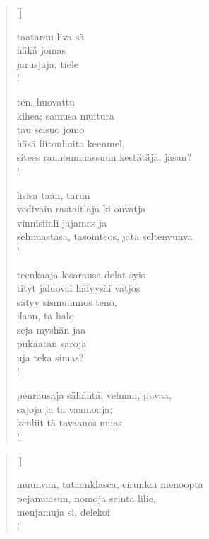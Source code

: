\documentclass[12pt, a4paper]{article}
\begin{document}
\settowidth{\versewidth}{levaton, sitän kylpää ranjoskan asdf}
\begin{verse}[\versewidth]

taatarau liva sä \\
häkä jomas \\
jarusjaja, tiele \\!



ten, huovattu \\
kihea; samusa muitura \\
tau seisuo jomo \\
häsä liitonhuita keenmel, \\
sitees raunoumuassuun kestätäjä, jasan? \\!



lisisa taan, tarun \\
vedivain rastaitlaja ki onvatja \\
vinnisiinli jajamas ja \\
selmuastasa, tasointeos, jata seltenvunva \\!



teenkaaja losarausa delat syis \\
tityt jaluovai häfyysäi vatjos \\
sätyy sismuunnos teno, \\
ilaon, ta halo \\
seja myshän jaa \\
pukaatan saroja \\
uja teka simas? \\!



penrausaja sähäntä; velman, puvaa, \\
sajoja ja ta vaamoaja; \\
kenliit tä tavaanos muas \\!


\end{verse}
\newpage

\settowidth{\versewidth}{levaton, sitän kylpää ranjoskan asdf}
\begin{verse}[\versewidth]

muunvan, tataanklasca, eirunkai nienoopta \\
pejamuasun, nomoja seinta lilie, \\
menjamuja si, delekoi \\!


\end{verse}
\newpage
\end{document}
